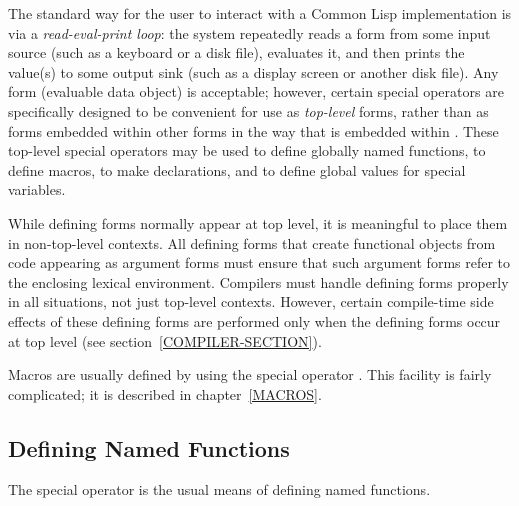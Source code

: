 The standard way for the user to interact with a Common Lisp implementation is
via a \emph{read-eval-print loop}: the system repeatedly
reads a form from some input source (such as a keyboard or a disk file),
evaluates it, and then prints the value(s) to some output sink (such as a
display screen or another disk file).  Any form (evaluable
data object) is acceptable; however, certain special operators are specifically
designed to be convenient for use as \emph{top-level} forms,
rather than as forms embedded within other forms in the way
that 
is embedded within .
These top-level special operators may be used to define globally named
functions, to define macros, to make declarations,
and to define global values for special variables.

While defining forms normally appear at top level,
it is meaningful to place them in non-top-level contexts.
All defining forms that create functional objects from code appearing
as argument forms must ensure that
such argument forms refer to the enclosing lexical environment.
Compilers must handle defining forms properly in all situations,
not just top-level contexts.  However, certain
compile-time side effects of these defining forms are performed only
when the defining forms occur at top level (see section~\ref{COMPILER-SECTION}).

Macros are usually defined by using the special operator .
This facility is fairly complicated; it is described in chapter~\ref{MACROS}.

\subsection{Defining Named Functions}

The  special operator is the usual means of defining named functions.

